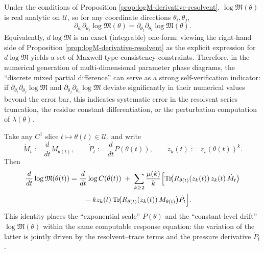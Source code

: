 \begin{remark}\label{cor:logM-maxwell}
Under the conditions of Proposition \ref{prop:logM-derivative-resolvent}, $\log\mathfrak{M}(\theta)$ is real analytic on $\mathcal{U}$,
so for any coordinate directions $\theta_i,\theta_j$,
\[
\partial_{\theta_i}\partial_{\theta_j}\log\mathfrak{M}(\theta)=\partial_{\theta_j}\partial_{\theta_i}\log\mathfrak{M}(\theta).
\]
Equivalently, $d\log\mathfrak{M}$ is an exact (integrable) one-form; viewing the right-hand side of Proposition \ref{prop:logM-derivative-resolvent} as the explicit expression for $d\log\mathfrak{M}$ yields a set of Maxwell-type consistency constraints.
Therefore, in the numerical generation of multi-dimensional parameter phase diagrams, the ``discrete mixed partial difference'' can serve as a strong self-verification indicator: if
\(
\partial_{\theta_i}\partial_{\theta_j}\log\mathfrak{M}
\)
and
\(
\partial_{\theta_j}\partial_{\theta_i}\log\mathfrak{M}
\)
deviate significantly in their numerical values beyond the error bar, this indicates systematic error in the resolvent series truncation, the residue constant differentiation, or the perturbation computation of $\lambda(\theta)$.
\end{remark}

\begin{remark}\label{cor:logM-two-scale-coupling}
Take any $C^1$ slice $t\mapsto \theta(t)\in\mathcal{U}$, and write
\[
\dot{M}_t:=\frac{d}{dt}M_{\theta(t)},\qquad
\dot{P}_t:=\frac{d}{dt}P(\theta(t)),\qquad
z_k(t):=z_\star(\theta(t))^k.
\]
Then
\[
\begin{aligned}
\frac{d}{dt}\log\mathfrak{M}(\theta(t))
&=\frac{d}{dt}\log C(\theta(t))
\;+\;\sum_{k\ge 2}\frac{\mu(k)}{k}\Bigl[
\mathrm{Tr}\!\bigl(R_{\theta(t)}(z_k(t))\,z_k(t)\,\dot{M}_t\bigr)\\
&\qquad -k z_k(t)\,\mathrm{Tr}\!\bigl(R_{\theta(t)}(z_k(t))\,M_{\theta(t)}\bigr)\dot{P}_t
\Bigr].
\end{aligned}
\]
This identity places the ``exponential scale'' $P(\theta)$ and the ``constant-level drift'' $\log\mathfrak{M}(\theta)$ within the same computable response equation: the variation of the latter is jointly driven by the resolvent--trace terms and the pressure derivative $\dot P_t$.
\end{remark}
